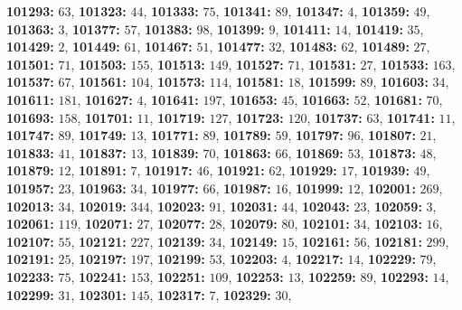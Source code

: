 \textsf{\bfseries 101293:} $63$, \textsf{\bfseries 101323:} $44$, \textsf{\bfseries 101333:} $75$, \textsf{\bfseries 101341:} $89$, \textsf{\bfseries 101347:} $4$, \textsf{\bfseries 101359:} $49$, \textsf{\bfseries 101363:} $3$, \textsf{\bfseries 101377:} $57$, \textsf{\bfseries 101383:} $98$, \textsf{\bfseries 101399:} $9$, \textsf{\bfseries 101411:} $14$, \textsf{\bfseries 101419:} $35$, \textsf{\bfseries 101429:} $2$, \textsf{\bfseries 101449:} $61$, \textsf{\bfseries 101467:} $51$, \textsf{\bfseries 101477:} $32$, \textsf{\bfseries 101483:} $62$, \textsf{\bfseries 101489:} $27$, \textsf{\bfseries 101501:} $71$, \textsf{\bfseries 101503:} $155$, \textsf{\bfseries 101513:} $149$, \textsf{\bfseries 101527:} $71$, \textsf{\bfseries 101531:} $27$, \textsf{\bfseries 101533:} $163$, \textsf{\bfseries 101537:} $67$, \textsf{\bfseries 101561:} $104$, \textsf{\bfseries 101573:} $114$, \textsf{\bfseries 101581:} $18$, \textsf{\bfseries 101599:} $89$, \textsf{\bfseries 101603:} $34$, \textsf{\bfseries 101611:} $181$, \textsf{\bfseries 101627:} $4$, \textsf{\bfseries 101641:} $197$, \textsf{\bfseries 101653:} $45$, \textsf{\bfseries 101663:} $52$, \textsf{\bfseries 101681:} $70$, \textsf{\bfseries 101693:} $158$, \textsf{\bfseries 101701:} $11$, \textsf{\bfseries 101719:} $127$, \textsf{\bfseries 101723:} $120$, \textsf{\bfseries 101737:} $63$, \textsf{\bfseries 101741:} $11$, \textsf{\bfseries 101747:} $89$, \textsf{\bfseries 101749:} $13$, \textsf{\bfseries 101771:} $89$, \textsf{\bfseries 101789:} $59$, \textsf{\bfseries 101797:} $96$, \textsf{\bfseries 101807:} $21$, \textsf{\bfseries 101833:} $41$, \textsf{\bfseries 101837:} $13$, \textsf{\bfseries 101839:} $70$, \textsf{\bfseries 101863:} $66$, \textsf{\bfseries 101869:} $53$, \textsf{\bfseries 101873:} $48$, \textsf{\bfseries 101879:} $12$, \textsf{\bfseries 101891:} $7$, \textsf{\bfseries 101917:} $46$, \textsf{\bfseries 101921:} $62$, \textsf{\bfseries 101929:} $17$, \textsf{\bfseries 101939:} $49$, \textsf{\bfseries 101957:} $23$, \textsf{\bfseries 101963:} $34$, \textsf{\bfseries 101977:} $66$, \textsf{\bfseries 101987:} $16$, \textsf{\bfseries 101999:} $12$, \textsf{\bfseries 102001:} $269$, \textsf{\bfseries 102013:} $34$, \textsf{\bfseries 102019:} $344$, \textsf{\bfseries 102023:} $91$, \textsf{\bfseries 102031:} $44$, \textsf{\bfseries 102043:} $23$, \textsf{\bfseries 102059:} $3$, \textsf{\bfseries 102061:} $119$, \textsf{\bfseries 102071:} $27$, \textsf{\bfseries 102077:} $28$, \textsf{\bfseries 102079:} $80$, \textsf{\bfseries 102101:} $34$, \textsf{\bfseries 102103:} $16$, \textsf{\bfseries 102107:} $55$, \textsf{\bfseries 102121:} $227$, \textsf{\bfseries 102139:} $34$, \textsf{\bfseries 102149:} $15$, \textsf{\bfseries 102161:} $56$, \textsf{\bfseries 102181:} $299$, \textsf{\bfseries 102191:} $25$, \textsf{\bfseries 102197:} $197$, \textsf{\bfseries 102199:} $53$, \textsf{\bfseries 102203:} $4$, \textsf{\bfseries 102217:} $14$, \textsf{\bfseries 102229:} $79$, \textsf{\bfseries 102233:} $75$, \textsf{\bfseries 102241:} $153$, \textsf{\bfseries 102251:} $109$, \textsf{\bfseries 102253:} $13$, \textsf{\bfseries 102259:} $89$, \textsf{\bfseries 102293:} $14$, \textsf{\bfseries 102299:} $31$, \textsf{\bfseries 102301:} $145$, \textsf{\bfseries 102317:} $7$, \textsf{\bfseries 102329:} $30$, 
